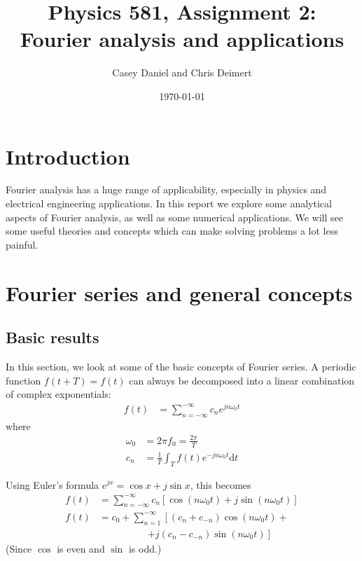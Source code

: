 \documentclass[twocolumn]{myarticle}
\renewcommand{\d}{\mathrm{d}}
\begin{document}
\title{Physics 581, Assignment 2:\\Fourier analysis and applications}
\author{Casey Daniel and Chris Deimert}
\date{\today}

\maketitle

\section{Introduction}
\label{sec:introduction}

Fourier analysis has a huge range of applicability, especially in physics and electrical engineering applications.
In this report we explore some analytical aspects of Fourier analysis, as well as some numerical applications.
We will see some useful theories and concepts which can make solving problems a lot less painful.

\section{Fourier series and general concepts}
\label{sec:fourier_series_and_general_concepts}

\subsection{Basic results}
\label{subsec:basic_results}

In this section, we look at some of the basic concepts of Fourier series.
A periodic function $ f(t+T) = f(t) $ can always be decomposed into a linear combination of complex exponentials:
\begin{align}
    f(t) &= \sum_{n = -\infty}^{-\infty} c_n e^{j n \omega_0 t}
\end{align}
where
\begin{align}
    \omega_0 &= 2 \pi f_0 =  \frac{2 \pi}{T}
    \\
    c_n &= \frac{1}{T} \int_{T} f(t) e^{-j n \omega_0 t} \d t
\end{align}

Using Euler's formula $ e^{jx} = \cos x + j \sin x $, this becomes
\begin{align}
    f(t) &= \sum_{n = -\infty}^{-\infty} c_n \left[ \cos (n \omega_0 t) + j \sin (n \omega_0 t) \right]
    \\
    f(t) &= c_0 + \sum_{n = 1}^{-\infty} \left[ (c_n + c_{-n}) \cos (n \omega_0 t) + \right.
    \nonumber \\
    &\qquad \qquad \quad \left. + j (c_n - c_{-n}) \sin (n \omega_0 t) \right]
\end{align}
(Since $ \cos $ is even and $ \sin $ is odd.)
\end{document}
